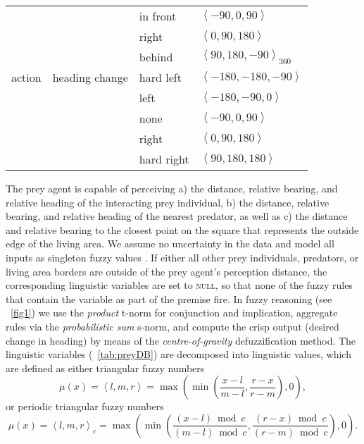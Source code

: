 \begin{table}
\begin{tabular}{lllp{2.7cm}}
    & & in front & $\left<-90,0,90\right>$ \\
    & & right & $\left<0,90,180\right>$ \\
    & & behind & $\left<90,180,-90\right>_{360}$ \\
    \hdashline
    action & heading change & hard left & $\left<-180,-180,-90\right>$ \\
    & & left & $\left<-180,-90,0\right>$ \\
    & & none & $\left<-90,0,90\right>$ \\
    & & right & $\left<0,90,180\right>$ \\
    & & hard right & $\left<90,180,180\right>$ \\
    \bottomrule
  \end{tabular}
\end{table}

The prey agent is capable of perceiving a) the distance, relative bearing, and relative heading of the interacting prey individual, b) the distance, relative bearing, and relative heading of the nearest predator, as well as c) the distance and relative bearing to the closest point on the square that represents the outside edge of the living area. We assume no uncertainty in the data and model all inputs as singleton fuzzy values \cite{mendel2001uncertain}. If either all other prey individuals, predators, or living area borders are outside of the prey agent's perception distance, the corresponding linguistic variables are set to \textsc{null}, so that none of the fuzzy rules that contain the variable as part of the premise fire. In fuzzy reasoning (see \figurename~\ref{fig1}) we use the \emph{product} t-norm for conjunction and implication, aggregate rules via the \emph{probabilistic sum} s-norm, and compute the crisp output (desired change in heading) by means of the \emph{centre-of-gravity} defuzzification method. The linguistic variables (\tablename~\ref{tab:preyDB}) are decomposed into linguistic values, which are defined as either triangular fuzzy numbers
%
\begin{equation}
\mu(x)=\left<l,m,r\right>=\max{\left(\min\left(\frac{x-l}{m-l}, \frac{r-x}{r-m}\right),0\right)},
\end{equation}
%
or periodic triangular fuzzy numbers
%
\begin{equation}
\mu(x)=\left<l,m,r\right>_c=\max\left(\min\left(\frac{(x-l) \bmod c}{(m-l) \bmod c}, \frac{(r-x) \bmod c}{(r-m) \bmod c}\right),0\right).
\end{equation}

